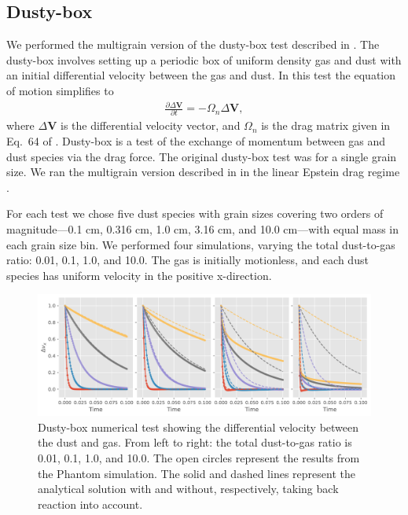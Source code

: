 \documentclass[fleqn,usenatbib]{mnras}
\let\vec\mathbf
\begin{document}
\subsection{Dusty-box}

We performed the multigrain version of the dusty-box test described in
\citet{Laibe:2011}. The dusty-box involves setting up a periodic box of uniform
density gas and dust with an initial differential velocity between the gas and
dust. In this test the equation of motion simplifies to
%
\begin{align}
   \frac{\partial \Delta \vec{V}}{\partial t} = - \Omega_n \Delta \vec{V},
\end{align}
%
where $\Delta \vec{V}$ is the differential velocity vector, and $\Omega_n$ is
the drag matrix given in Eq.~64 of \citet{Laibe:2014}. Dusty-box is a test
of the exchange of momentum between gas and dust species via the drag force. The
original dusty-box test was for a single grain size. We ran the multigrain
version described in \citet{Laibe:2014} in the linear Epstein drag regime
\citep{Epstein:1924}.

For each test we chose five dust species with grain sizes covering two orders of
magnitude---0.1 cm, 0.316 cm, 1.0 cm, 3.16 cm, and 10.0 cm---with equal mass in
each grain size bin. We performed four simulations, varying the total
dust-to-gas ratio: 0.01, 0.1, 1.0, and 10.0. The gas is initially motionless,
and each dust species has uniform velocity in the positive x-direction.

\begin{figure}
   \begin{center}
      \includegraphics[width=\textwidth]{figs/delta_vx_Epstein.pdf}
      \caption{Dusty-box numerical test showing the differential velocity
         between the dust and gas. From left to right: the total dust-to-gas
         ratio is 0.01, 0.1, 1.0, and 10.0. The open circles represent the
         results from the Phantom simulation. The solid and dashed lines
         represent the analytical solution with and without, respectively,
         taking back reaction into account.\label{fig:dustybox-Epstein}}
   \end{center}
\end{figure}
\end{document}
